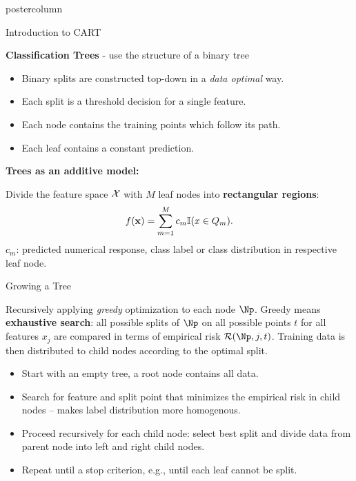 \documentclass{beamer}
\begin{document}
\begin{frame}[fragile]{}
\begin{columns}
\begin{column}{.31\textwidth}
\begin{beamercolorbox}[center]{postercolumn}
\begin{minipage}{.98\textwidth}
{\begin{myblock}{Introduction to CART}
      \begin{codebox}
        \textbf{Classification Trees} - use the structure of a binary tree
      \end{codebox}
      \begin{itemize}[$\bullet$]     
        \setlength{\itemindent}{+.3in}
        \item Binary splits are constructed top-down in a \emph{data optimal} way.
        \item Each split is a threshold decision for a single feature.
        \item Each node contains the training points which follow its path.
        \item Each leaf contains a constant prediction.
   \end{itemize}

      \begin{codebox}
        \textbf{Trees as an additive model: }
      \end{codebox}
      Divide the feature space $\mathcal{X}$ with $M$ leaf nodes into \textbf{rectangular regions}:
      $$f(\mathbf{x}) = \sum_{m=1}^M c_m \mathbb{I}(x \in Q_m).$$
      $c_m$: predicted numerical response, class label or class distribution in respective leaf node.
\end{myblock}

\begin{myblock}{Growing a Tree}
  
  Recursively applying \emph{greedy} optimization to each node $\Np$. 
  Greedy means \textbf{exhaustive search}: all possible splits of $\Np$ on all possible points $t$ for all features $x_j$ are compared in terms of empirical risk $\risk(\Np, j, t)$.
  Training data is then distributed to child nodes according to the optimal split.
  \begin{itemize}[$\bullet$]     
    \setlength{\itemindent}{+.3in}
    \item Start with an empty tree, a root node contains all data.
    \item Search for feature and split point that minimizes the empirical risk in child nodes --  makes label distribution more homogenous.
    \item Proceed recursively for each child node: select best split and divide data from parent node into left and right child nodes.
    \item Repeat until a stop criterion, e.g., until each leaf cannot be split.
  \end{itemize}


\end{myblock}}
\end{minipage}
\end{beamercolorbox}
\end{column}
\end{columns}
\end{frame}
\end{document}
